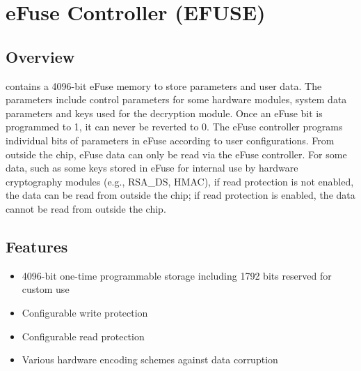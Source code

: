 \documentclass[main\_\_EN.tex]{subfiles}
\begin{document}

\ifglobal
\else
    {\let\clearpage\relax \listoftodos}
    {\let\clearpage\relax \listofdonetodos}
    \tableofcontents
\fi











\hypertarget{efuse}{}
\chapter{eFuse Controller (EFUSE)}
\label{mod:efuse}

\section{Overview}

\chipname{} contains a 4096-bit eFuse memory to store parameters and user data. The parameters include control parameters for some hardware modules, system data parameters and keys used for the decryption module. Once an eFuse bit is programmed to 1, it can never be reverted to 0. The eFuse controller programs individual bits of parameters in eFuse according to user configurations. From outside the chip, eFuse data can only be read via the eFuse controller. For some data, such as some keys stored in eFuse for internal use by hardware cryptography modules (e.g., RSA\_DS, HMAC), if read protection is not enabled, the data can be read from outside the chip; if read protection is enabled, the data cannot be read from outside the chip.


\section{Features}

\begin{itemize}
    \item 4096-bit one-time programmable storage including 1792 bits reserved for custom use
    \item Configurable write protection
    \item Configurable read protection
    \item Various hardware encoding schemes against data corruption
\end{itemize}
\end{document}
